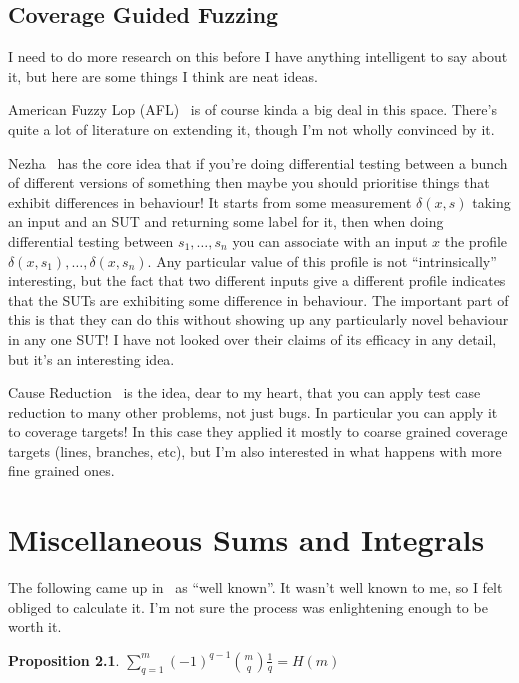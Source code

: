 \documentclass[a4paper]{book}
\newtheorem{proposition}{Proposition}
\begin{document}
\section{Coverage Guided Fuzzing}

I need to do more research on this before I have anything intelligent to say about it,
but here are some things I think are neat ideas.

American Fuzzy Lop (AFL)~\cite{AFL} is of course kinda a big deal in this space.
There's quite a lot of literature on extending it,
though I'm not wholly convinced by it.

Nezha~\cite{DBLP:conf/sp/PetsiosTSKJ17} has the core idea that if you're doing differential testing between a bunch of different versions of something then maybe you should prioritise things that exhibit differences in behaviour!
It starts from some measurement \(\delta(x, s)\) taking an input and an SUT and returning some label for it,
then when doing differential testing between \(s_1, \ldots, s_n\) you can associate with an input \(x\) the profile \(\delta(x, s_1), \ldots, \delta(x, s_n)\).
Any particular value of this profile is not ``intrinsically'' interesting,
but the fact that two different inputs give a different profile indicates that the SUTs are exhibiting some difference in behaviour.
The important part of this is that they can do this without showing up any particularly novel behaviour in any one SUT!\@
I have not looked over their claims of its efficacy in any detail,
but it's an interesting idea.

Cause Reduction~\cite{DBLP:journals/stvr/GroceAZCR16} is the idea,
dear to my heart,
that you can apply test case reduction to many other problems,
not just bugs.
In particular you can apply it to coverage targets!
In this case they applied it mostly to coarse grained coverage targets (lines, branches, etc),
but I'm also interested in what happens with more fine grained ones.

\chapter{Miscellaneous Sums and Integrals}

The following came up in~\cite{DBLP:journals/dam/FlajoletGT92} as ``well known''.
It wasn't well known to me,
so I felt obliged to calculate it.
I'm not sure the process was enlightening enough to be worth it.

\begin{proposition}
\(\sum\limits_{q = 1}^m {(-1)}^{q - 1} {m \choose q} \frac{1}{q} = H(m)\)
\end{proposition}
\end{document}
